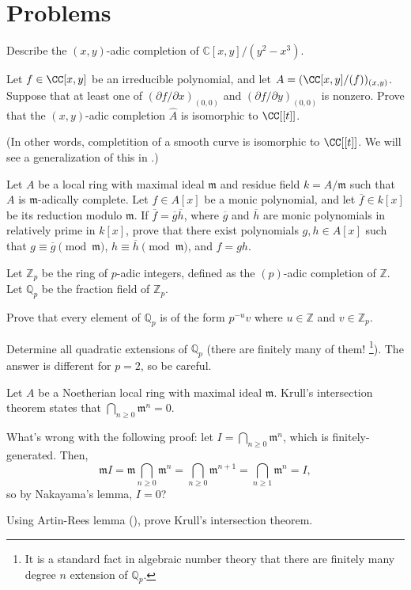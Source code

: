 \section{Problems}
\begin{problem}
Describe the $(x,y)$-adic completion of 
$\mathbb C[x,y]/(y^2-x^3)$.
\end{problem}
\begin{problem}
Let $f\in\CC[x,y]$ be an irreducible polynomial,
and let $A=(\CC[x,y]/(f))_{(x,y)}$.
Suppose that at least one of $(\partial f/\partial x)_{(0,0)}$
and $(\partial f/\partial y)_{(0,0)}$ is nonzero.
Prove that the $(x,y)$-adic 
completion $\widehat A$ is isomorphic to $\CC[[t]]$.

(In other words, completition of a smooth curve 
is isomorphic to $\CC[[t]]$.
We will see a generalization of this in .)
\end{problem}
\begin{problem}
Let $A$ be a local ring with maximal ideal $\mathfrak m$ and residue field $k=A/\mathfrak m$ such that $A$ is $\mathfrak m$-adically complete. 
Let $f\in A[x]$ be a monic polynomial, and let $\overline f\in k[x]$ be its reduction modulo $\mathfrak m$.
If $\overline f = \overline g \overline h$, where $\overline g$ and $\overline h$ are monic polynomials in relatively prime in $k[x]$, prove that there exist polynomials $g,h\in A[x]$ such that $g\equiv \overline g\pmod{\mathfrak m}$, $h\equiv \overline h\pmod{\mathfrak m}$, and $f=gh$.
\end{problem}
\begin{problem}
Let $\mathbb Z_p$ be the ring of $p$-adic integers, defined as the $(p)$-adic completion of $\mathbb Z$. Let $\mathbb Q_p$ be the fraction field of $\mathbb Z_p$.
\begin{alphenum}
\item Prove that every element of $\mathbb Q_p$ is of the form $p^{-u}v$ where $u\in\mathbb Z$ and $v\in\mathbb Z_p$.
\item Determine all quadratic extensions of $\mathbb Q_p$ (there are finitely many of them!%
\footnote{It is a standard fact in algebraic number theory that there are finitely many degree $n$ extension of $\mathbb Q_p$.}). 
The answer is different for $p=2$, so be careful.
\end{alphenum} 
\end{problem}
\begin{problem}
Let $A$ be a Noetherian local ring with maximal ideal $\mathfrak m$.
Krull's intersection theorem states that 
$\textstyle{\bigcap_{n\geq 0} \mathfrak m^n=0}$.
\begin{alphenum}
\item What's wrong with the following proof: 
let $I=\textstyle{\bigcap_{n\geq 0} \mathfrak m^n}$, which is finitely-generated. Then,
$$\mathfrak mI = \mathfrak m\bigcap_{n\geq 0} \mathfrak m^n 
= \bigcap_{n\geq 0} \mathfrak m^{n+1} 
= \bigcap_{n\geq 1}\mathfrak m^n = I,$$
so by Nakayama's lemma, $I=0$?
\item Using Artin-Rees lemma (),
prove Krull's intersection theorem.
\end{alphenum}
\end{problem}
